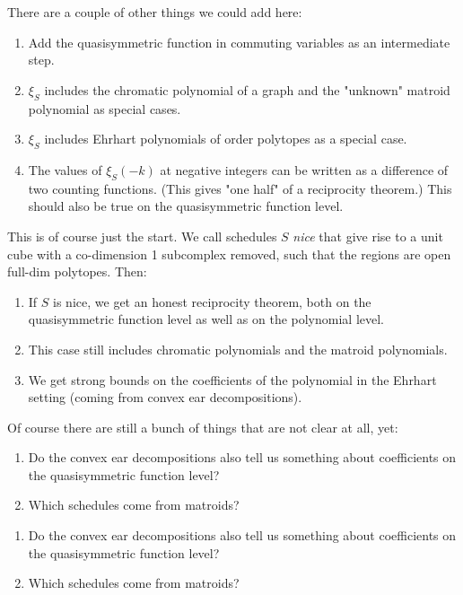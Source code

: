 \documentclass[11pt,letter]{amsart}
\newcommand{\defn}[1]{\emph{#1}}
\begin{document}
There are a couple of other things we could add here:
\begin{enumerate}
\item Add the quasisymmetric function in commuting variables as an intermediate step.
\item $\xi_S$ includes the chromatic polynomial of a graph and the "unknown" matroid polynomial as special cases.
\item $\xi_S$ includes Ehrhart polynomials of order polytopes as a special case.
\item The values of $\xi_S(-k)$ at negative integers can be written as a difference of two counting functions. (This gives "one half" of a reciprocity theorem.) This should also be true on the quasisymmetric function level.
\end{enumerate}

This is of course just the start. We call schedules $S$ \defn{nice} that give rise to a unit cube with a co-dimension 1 subcomplex removed, such that the regions are open full-dim polytopes. Then:
\begin{enumerate}
\item If $S$ is nice, we get an honest reciprocity theorem, both on the quasisymmetric function level as well as on the polynomial level.
\item This case still includes chromatic polynomials and the matroid polynomials.
\item We get strong bounds on the coefficients of the polynomial in the Ehrhart setting (coming from convex ear decompositions).
\end{enumerate}

Of course there are still a bunch of things that are not clear at all, yet:
\begin{enumerate} 
\item Do the convex ear decompositions also tell us something about coefficients on the quasisymmetric function level?
\item Which schedules come from matroids? 
\end{enumerate}

\begin{enumerate}
\item Do the convex ear decompositions also tell us something about coefficients on the quasisymmetric function level?
\item Which schedules come from matroids? 
\end{enumerate}
\end{document}
